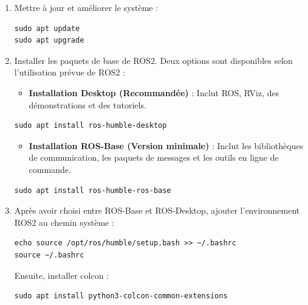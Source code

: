 \begin{enumerate}
\item Mettre à jour et améliorer le système :
\begin{lstlisting}[style=commandstyle]
sudo apt update
sudo apt upgrade
\end{lstlisting}

\item Installer les paquets de base de ROS2. Deux options sont disponibles selon l'utilisation prévue de ROS2 :
\begin{itemize}
\item \textbf{Installation Desktop (Recommandée)} : Inclut ROS, RViz, des démonstrations et des tutoriels.
\end{itemize}

\begin{lstlisting}[style=commandstyle]
sudo apt install ros-humble-desktop
\end{lstlisting}
\begin{itemize}

\item \textbf{Installation ROS-Base (Version minimale)} : Inclut les bibliothèques de communication, les paquets de messages et les outils en ligne de commande.
\end{itemize}

\begin{lstlisting}[style=commandstyle]
sudo apt install ros-humble-ros-base
\end{lstlisting}

\item Après avoir choisi entre ROS-Base et ROS-Desktop, ajouter l'environnement ROS2 au chemin système :
\begin{lstlisting}[style=commandstyle]
echo source /opt/ros/humble/setup.bash >> ~/.bashrc
source ~/.bashrc
\end{lstlisting}

\noindent Ensuite, installer colcon :
\begin{lstlisting}[style=commandstyle]
sudo apt install python3-colcon-common-extensions
\end{lstlisting}

\end{enumerate}
